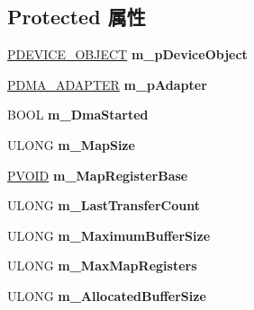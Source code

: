 \subsection*{Protected 属性}
\begin{DoxyCompactItemize}
\item 
\mbox{\label{class_c_dma_channel_init_a6ef576d87e7a4a129b91b63a0b99ae73}} 
\hyperlink{struct___d_e_v_i_c_e___o_b_j_e_c_t}{P\+D\+E\+V\+I\+C\+E\+\_\+\+O\+B\+J\+E\+CT} {\bfseries m\+\_\+p\+Device\+Object}
\item 
\mbox{\label{class_c_dma_channel_init_a865678107c27dd0e1971d7a99093c58d}} 
\hyperlink{struct___d_m_a___a_d_a_p_t_e_r}{P\+D\+M\+A\+\_\+\+A\+D\+A\+P\+T\+ER} {\bfseries m\+\_\+p\+Adapter}
\item 
\mbox{\label{class_c_dma_channel_init_a4b944cf5e607173ad2cd65b3acc3177f}} 
B\+O\+OL {\bfseries m\+\_\+\+Dma\+Started}
\item 
\mbox{\label{class_c_dma_channel_init_ad7b7e07754b4a862a0ab610fd73b06ab}} 
U\+L\+O\+NG {\bfseries m\+\_\+\+Map\+Size}
\item 
\mbox{\label{class_c_dma_channel_init_a04e95f84dff457572b1fd344d1e39122}} 
\hyperlink{interfacevoid}{P\+V\+O\+ID} {\bfseries m\+\_\+\+Map\+Register\+Base}
\item 
\mbox{\label{class_c_dma_channel_init_a4b15df211af202e934ad174af6e4158a}} 
U\+L\+O\+NG {\bfseries m\+\_\+\+Last\+Transfer\+Count}
\item 
\mbox{\label{class_c_dma_channel_init_ae179c496750b2640b971b4dabc5ef1a8}} 
U\+L\+O\+NG {\bfseries m\+\_\+\+Maximum\+Buffer\+Size}
\item 
\mbox{\label{class_c_dma_channel_init_ac8679b5caea137936fc86bd76ea1a81b}} 
U\+L\+O\+NG {\bfseries m\+\_\+\+Max\+Map\+Registers}
\item 
\mbox{\label{class_c_dma_channel_init_acb48ab295a3b0367e09d8d233f0d5ea6}} 
U\+L\+O\+NG {\bfseries m\+\_\+\+Allocated\+Buffer\+Size}

\end{DoxyCompactItemize}
